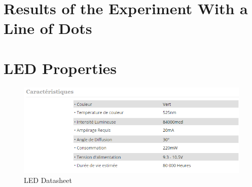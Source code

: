 \documentclass[12pt,a4paper,fleqn, onesside]{report}
\begin{document}




\appendix
{}
\section{Results of the Experiment With a Line of Dots}


\newpage
\section{LED Properties}
\label{LEDdatasheet}
\begin{figure}[h]
  \centerline{\includegraphics[scale=0.8]{fig/LedDataSheet.png}}
  \caption{LED Datasheet}
  \label{fig:LEDdatasheet}
\end{figure}

\newpage
\end{document}
